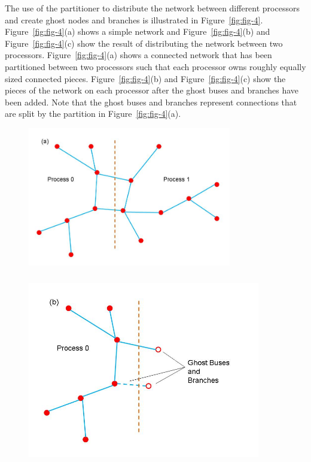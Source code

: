 \documentclass[12pt]{report} %
\begin{document}
The use of the partitioner to distribute the network between different processors and create ghost nodes and branches is illustrated in Figure~\ref{fig:fig-4}. Figure~\ref{fig:fig-4}(a) shows a simple network and Figure~\ref{fig:fig-4}(b) and Figure~\ref{fig:fig-4}(c) show the result of distributing the network between two processors. Figure~\ref{fig:fig-4}(a) shows a connected network that has been partitioned between two processors such that each processor owns roughly equally sized connected pieces. Figure~\ref{fig:fig-4}(b) and Figure~\ref{fig:fig-4}(c) show the pieces of the network on each processor after the ghost buses and branches have been added. Note that the ghost buses and branches represent connections that are split by the partition in  Figure~\ref{fig:fig-4}(a).

\begin{figure}
  \centering
    \includegraphics*[width=3.5in, keepaspectratio=true, trim=0.00in 0.30in 0.00in 0.40in]{Fig4a}
    \includegraphics*[width=4in, height=3.55in, keepaspectratio=true]{Fig4b}

\end{figure}
\end{document}
